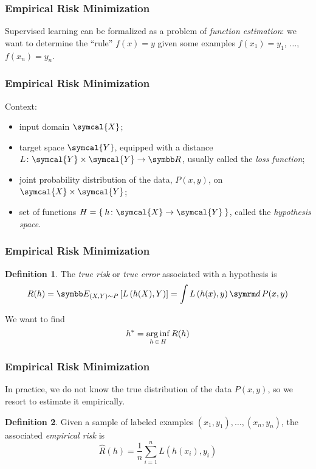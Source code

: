 \documentclass{beamer}
\theoremstyle{definition}
\newtheorem*{definition*}{Definition}
\begin{document}
\begin{frame}
\frametitle{Empirical Risk Minimization}

Supervised learning can be formalized as a problem of \emph{function estimation}: we want to determine the ``rule'' \(f(x) = y\) given some examples \(f(x_1) = y_1\), \(\dots\), \(f(x_n) = y_n\).
\end{frame}

\begin{frame}
\frametitle{Empirical Risk Minimization}

Context:
\begin{itemize}
    \item input domain \(\symcal{X}\);
    \item target space \(\symcal{Y}\), equipped with a distance \(L \colon \symcal{Y} \times \symcal{Y} \to \reals\), usually called the \emph{loss function};
    \item joint probability distribution of the data, \(P(x, y)\), on \(\symcal{X} \times \symcal{Y}\);
    \item set of functions \(H = \Set{ h \colon \symcal{X} \to \symcal{Y} }\), called the \emph{hypothesis space}.
\end{itemize}
\end{frame}

\begin{frame}
\frametitle{Empirical Risk Minimization}
    
\begin{definition*}
The \emph{true risk} or \emph{true error} associated with a hypothesis is 
\[
    R(h) = \expectedvalue_{(X, Y) \sim P} \left[L\left(h(X), Y\right)\right] = \int L\left(h(x), y\right) \diff \, P(x, y)  
\]
\end{definition*}

We want to find
\[
    h^* = \operatorname*{arg\,inf}_{h \, \in \, H} R(h)
\]
\end{frame}

\begin{frame}
\frametitle{Empirical Risk Minimization}

In practice, we do not know the true distribution of the data \(P(x, y)\), so we resort to estimate it empirically.

\begin{definition*}
Given a sample of labeled examples \(\left(x_1, y_1\right), \dots, \left(x_n, y_n\right)\), the associated \emph{empirical risk} is
\[
    \widehat{R}(h) = \frac{1}{n} \sum_{i = 1}^{n} L\left(h(x_i), y_i\right)
\]
\end{definition*}
\end{frame}
\end{document}
